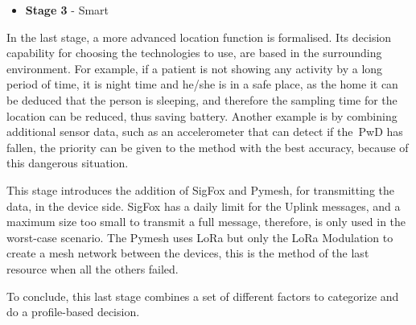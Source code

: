 \newpage
\begin{itemize}
\item \textbf{Stage 3} - Smart 
\end{itemize}

In the last stage, a more advanced location function is formalised. Its decision capability for choosing the technologies to use, are based in the surrounding environment. For example, if a patient is not showing any activity by a long period of time, it is night time and he/she is in a safe place, as the home it can be deduced that the person is sleeping, and therefore the sampling time for the location can be reduced, thus saving battery.
Another example is by combining additional
sensor data, such as  an accelerometer that can detect if the~\gls{PwD} has fallen, the priority can be given to the method with the best accuracy, because of this dangerous situation.

This stage introduces the addition of SigFox and Pymesh, for transmitting the data, in the device side. SigFox has a daily limit for the Uplink messages, and a maximum size too small to transmit a full message, therefore, is only used in the worst-case scenario. The Pymesh uses LoRa but only the LoRa Modulation to create a mesh network between the devices, this is the method of the last resource when all the others failed.

To conclude, this last stage combines a set of different
factors to categorize and do a profile-based decision.

